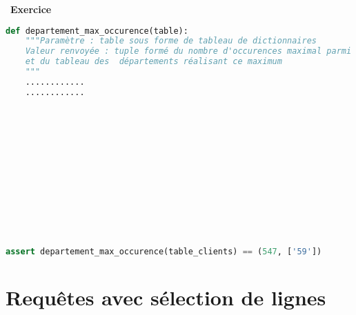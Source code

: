 \documentclass[
  11pt,
]{article}
\newcounter{exo}
\newenvironment{exercice}[1]
{\par \medskip   \addtocounter{exo}{1} \noindent  
\begin{bclogo}[arrondi =0.1,   noborder = true, logo=\bccrayon, marge=4]{~\textbf{Exercice} \textbf{\theexo} {\itshape #1} }  \par}
{
\end{bclogo}
 \par \bigskip }
\newcounter{def}
\begin{document}
\begin{exercice}{}
\begin{lstlisting}[language=Python]
def departement_max_occurence(table):
    """Paramètre : table sous forme de tableau de dictionnaires
    Valeur renvoyée : tuple formé du nombre d'occurences maximal parmi les départements
    et du tableau des  départements réalisant ce maximum
    """
    ............
    ............ 













assert departement_max_occurence(table_clients) == (547, ['59'])
\end{lstlisting}

\end{exercice}

\hypertarget{requuxeates-avec-suxe9lection-de-lignes}{%
\section{Requêtes avec sélection de
lignes}\label{requuxeates-avec-suxe9lection-de-lignes}}
\end{document}
